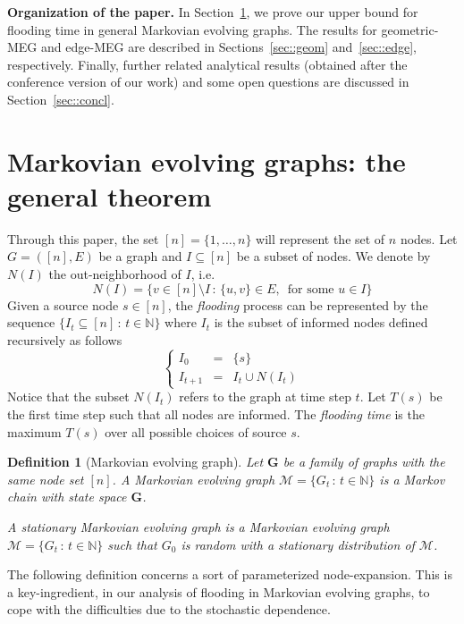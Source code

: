 \documentclass[10pt,a4paper]{article}
\newtheorem{definition}{Definition}[section]
\begin{document}
\medskip \noindent \textbf{Organization of the paper.}
In Section~\ref{sec::gen}, we prove our upper bound for flooding time in general Markovian evolving graphs. The results for geometric-MEG and edge-MEG are described in Sections~\ref{sec::geom} and~\ref{sec::edge}, respectively. Finally, further related analytical results (obtained after the conference version of our work) and some open questions are discussed in Section~\ref{sec::concl}.



\section{Markovian evolving graphs: the general theorem}\label{sec::gen}
Through this paper, the set  $[n]=\{ 1, \ldots , n\}$ will represent the set of $n$ nodes. Let $G=([n],E)$ be a graph and $I \subseteq [n]$ be a subset of nodes. We denote by $N(I)$ the out-neighborhood of $I$, i.e.
$$
N(I) = \{ v \in  [n] \setminus I \,:\, \{ u,v \} \in E,\, \mbox{ for some } u \in I \}
$$
Given a source node $s \in [n]$, the \emph{flooding} process can be represented by the sequence $\{I_t \subseteq [n] \,:\, t \in \mathbb{N}\}$ where $I_t$  is the subset of informed nodes defined recursively as follows
\[
\left\{
\begin{array}{lcl}
I_0 & = & \{s\}  \\
I_{t+1} & = & I_t \cup N(I_t)
\end{array}
\right.
\]
Notice that the subset $N(I_t)$ refers to the graph at time step $t$. Let $T(s)$ be the first time step such that all nodes are informed. The \emph{flooding time} is the maximum $T(s)$ over all possible choices of source $s$.


\begin{definition}[Markovian evolving  graph]\label{def::Markovevolv}
Let $\mathbf{G}$ be a family of graphs with the same node set $[n]$. A \emph{Markovian evolving graph} $\mathcal{M} =  \{ G_t \,:\, t \in \mathbb{N} \} $ is a Markov chain with state space $\mathbf{G}$.

\noindent A \emph{stationary} Markovian evolving  graph is a Markovian evolving graph $\mathcal{M} = \{ G_t \,:\, t \in \mathbb{N} \}$ such that $G_0$ is random with a stationary distribution of $\mathcal{M}$.
\end{definition}


\noindent The following definition concerns a sort of parameterized node-expansion. This is a key-ingredient, in our analysis of flooding in Markovian evolving  graphs, to cope with the difficulties due to the stochastic dependence.
\end{document}
